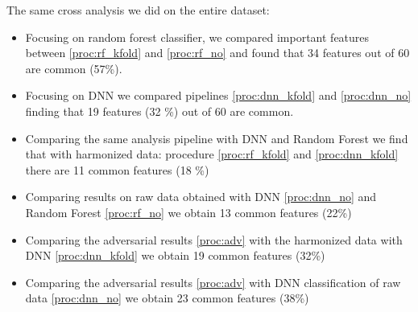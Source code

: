 \documentclass[11pt]{report}
\begin{document}
The same cross analysis we did on the entire dataset:

\begin{itemize}
\item Focusing on random forest classifier, we compared important features between \ref{proc:rf_kfold} and \ref{proc:rf_no} and found that 34 features out of 60 are common (57\%).
\item Focusing on DNN we compared pipelines \ref{proc:dnn_kfold} and \ref{proc:dnn_no} finding that 19 features (32 \%) out of 60 are common.
\item Comparing the same analysis pipeline with DNN and Random Forest we find that with harmonized data: procedure \ref{proc:rf_kfold} and \ref{proc:dnn_kfold} there are 11 common features (18 \%)
\item Comparing results on raw data obtained with DNN \ref{proc:dnn_no} and Random Forest \ref{proc:rf_no} we obtain 13 common features  (22\%)
\item Comparing the adversarial results \ref{proc:adv} with the harmonized data with DNN \ref{proc:dnn_kfold} we obtain 19 common features (32\%)
\item Comparing the adversarial results \ref{proc:adv} with DNN classification of raw data \ref{proc:dnn_no} we obtain 23 common features (38\%)
\end{itemize}
\end{document}
